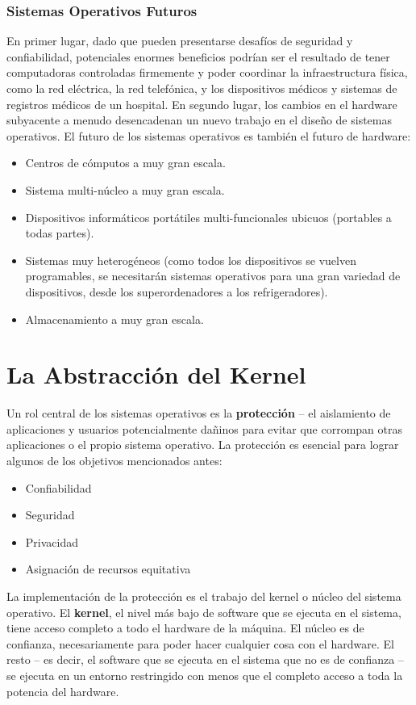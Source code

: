 \documentclass[10pt]{book}
\begin{document}
\subsection{Sistemas Operativos Futuros}
En primer lugar, dado que pueden presentarse desafíos de seguridad y confiabilidad, potenciales enormes beneficios podrían ser el resultado de tener computadoras controladas firmemente y poder coordinar la infraestructura física, como la red eléctrica, la red telefónica, y los dispositivos médicos y sistemas de registros médicos de un hospital. En segundo lugar, los cambios en el hardware subyacente a menudo desencadenan un nuevo trabajo en el diseño de sistemas operativos. El futuro de los sistemas operativos es también el futuro de hardware:

\begin{itemize}
\item Centros de cómputos a muy gran escala.
\item Sistema multi-núcleo a muy gran escala.
\item Dispositivos informáticos portátiles multi-funcionales ubicuos (portables a todas partes).
\item Sistemas muy heterogéneos (como todos los dispositivos se vuelven programables, se necesitarán sistemas operativos para una gran variedad de dispositivos, desde los superordenadores a los refrigeradores).
\item Almacenamiento a muy gran escala.
\end{itemize}

\clearpage

\chapter{La Abstracción del Kernel}
Un rol central de los sistemas operativos es la \textbf{protección} -- el aislamiento de aplicaciones y usuarios potencialmente dañinos para evitar que corrompan otras aplicaciones o el propio sistema operativo. La protección es esencial para lograr algunos de los objetivos mencionados antes:
\begin{itemize}
\item Confiabilidad
\item Seguridad
\item Privacidad
\item Asignación de recursos equitativa
\end{itemize}

La implementación de la protección es el trabajo del kernel o núcleo del sistema operativo. El \textbf{kernel}, el nivel más bajo de software que se ejecuta en el sistema, tiene acceso completo a todo el hardware de la máquina. El núcleo es de confianza, necesariamente para poder hacer cualquier cosa con el hardware. El resto -- es decir, el software que se ejecuta en el sistema que no es de confianza -- se ejecuta en un entorno restringido con menos que el completo acceso a toda la potencia del hardware.
\end{document}
